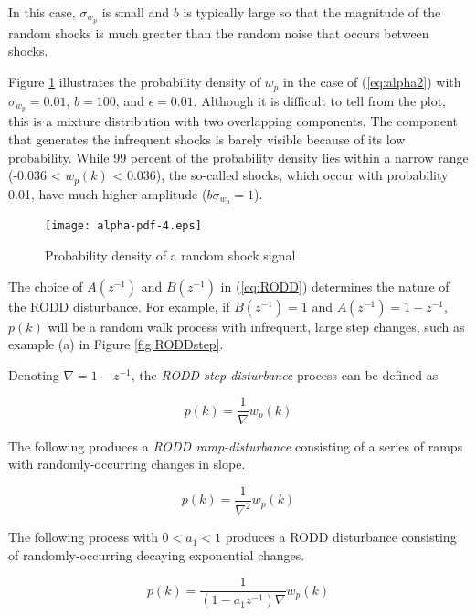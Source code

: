 In this case, $\sigma_{w_p}$ is small and $b$ is typically large so that the magnitude of the random shocks is much greater than the random noise that occurs between shocks.

Figure \ref{fig:alpha-pdf} illustrates the probability density of $w_p$ in the case of (\ref{eq:alpha2}) with $\sigma_{w_p}=0.01$, $b=100$, and $\epsilon=0.01$. Although it is difficult to tell from the plot, this is a mixture distribution with two overlapping components. The component that generates the infrequent shocks is barely visible because of its low probability. While 99 percent of the probability density lies within a narrow range (-0.036 < $w_p(k)$ < 0.036), the so-called shocks, which occur with probability 0.01, have much higher amplitude ($b\sigma_{w_p}=1$).

\begin{figure}[htp] \label{fig:alpha-pdf}
	\centering
	\texttt{[image: alpha-pdf-4.eps]}
	\caption{Probability density of a random shock signal}
\end{figure}

The choice of $A(z^{-1})$ and $B(z^{-1})$ in (\ref{eq:RODD}) determines the nature of the RODD disturbance. For example, if $B(z^{-1})=1$ and $A(z^{-1})=1-z^{-1}$, $p(k)$ will be a random walk process with infrequent, large step changes, such as example (a) in Figure \ref{fig:RODDstep}.

\begin{figure}[htp] \label{fig:RODD-examples}
\end{figure}

Denoting $\nabla=1-z^{-1}$, the \textit{RODD step-disturbance} process can be defined as

\begin{equation} \label{eq:RODD-step}
	p(k)= \frac{1}{\nabla}w_p(k)
\end{equation}

The following produces a \textit{RODD ramp-disturbance} consisting of a series of ramps with randomly-occurring changes in slope.

\begin{equation} \label{eq:RODD-ramp}
	p(k)= \frac{1}{\nabla^2}w_p(k)
\end{equation}

The following process with $0<a_1<1$ produces a RODD disturbance consisting of randomly-occurring decaying exponential changes.

\begin{equation} \label{eq:RODD-exp}
	p(k)= \frac{1}{(1-a_1z^{-1})\nabla}w_p(k)
\end{equation}

